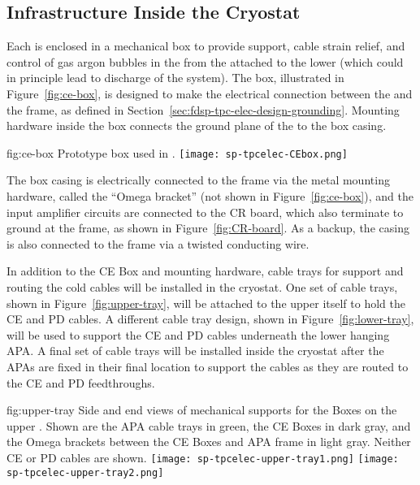 \subsection{Infrastructure Inside the Cryostat}
\label{sec:fdsp-tpcelec-design-infrastructure}

Each  is enclosed in a mechanical  box to provide support, cable strain
relief, and control of gas argon bubbles in the \lar from the  attached to the lower 
(which could in principle lead to discharge of the  system).
The  box, illustrated in Figure~\ref{fig:ce-box}, is designed to make the electrical connection 
between the  and the  frame, as defined in Section~\ref{sec:fdsp-tpc-elec-design-grounding}.
Mounting hardware inside the  box connects the ground plane of the  to the box casing.

\begin{dunefigure}
{fig:ce-box}
{Prototype  box used in .}
\texttt{[image: sp-tpcelec-CEbox.png]}
\end{dunefigure}

The  box casing is electrically connected to the  frame via the metal mounting hardware,
called the ``Omega bracket'' (not shown in Figure~\ref{fig:ce-box}), 
and the input amplifier circuits are connected to the CR board, which also terminate to
ground at the  frame, as shown in Figure~\ref{fig:CR-board}.
As a backup, the casing is also connected to the  frame via a twisted conducting wire.

In addition to the CE Box and mounting hardware, cable trays for support and routing the cold cables will be installed in the 
cryostat. One set of cable trays, shown in Figure~\ref{fig:upper-tray}, will be attached to the upper  itself 
to hold the CE and PD cables. A different cable tray design, shown in Figure~\ref{fig:lower-tray}, will be used
to support the CE and PD cables underneath the lower hanging APA. A final set of cable trays will be installed inside the 
cryostat after the APAs are fixed in their final location to support the cables as they are 
routed to the CE and PD feedthroughs.

\begin{dunefigure}
{fig:upper-tray}
{Side and end views of mechanical supports for the  Boxes on the upper . Shown are 
the APA cable trays in green, the CE Boxes in dark gray, and the Omega brackets between the CE Boxes 
and APA frame in light gray. Neither CE or PD cables are shown.}
\texttt{[image: sp-tpcelec-upper-tray1.png]}
\texttt{[image: sp-tpcelec-upper-tray2.png]}
\end{dunefigure}

